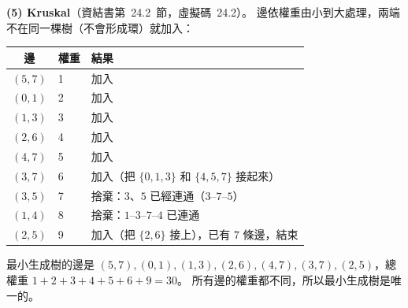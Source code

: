 \begin{pastsoln}
\textbf{(5) Kruskal}（資結書第~24.2~節，虛擬碼~24.2）。 邊依權重由小到大處理，兩端不在同一棵樹（不會形成環）就加入：
\begin{center}
\begin{tabular}{cll}
\toprule
邊 & 權重 & 結果 \\
\midrule
$(5,7)$ & 1 & 加入 \\
$(0,1)$ & 2 & 加入 \\
$(1,3)$ & 3 & 加入 \\
$(2,6)$ & 4 & 加入 \\
$(4,7)$ & 5 & 加入 \\
$(3,7)$ & 6 & 加入（把 $\{0,1,3\}$ 和 $\{4,5,7\}$ 接起來） \\
$(3,5)$ & 7 & 捨棄：$3$、$5$ 已經連通（$3$--$7$--$5$） \\
$(1,4)$ & 8 & 捨棄：$1$--$3$--$7$--$4$ 已連通 \\
$(2,5)$ & 9 & 加入（把 $\{2,6\}$ 接上），已有 $7$ 條邊，結束 \\
\bottomrule
\end{tabular}
\end{center}
最小生成樹的邊是 $(5,7), (0,1), (1,3), (2,6), (4,7), (3,7), (2,5)$，總權重 $1 + 2 + 3 + 4 + 5 + 6 + 9 = 30$。
所有邊的權重都不同，所以最小生成樹是唯一的。


\end{pastsoln}

